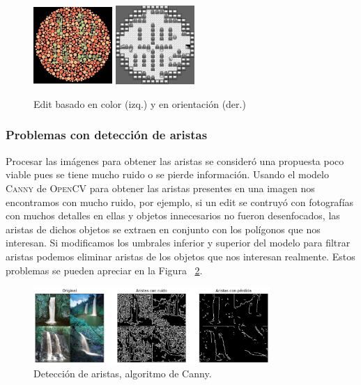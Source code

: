 \documentclass[spanish,11pt,letterpaper]{article}
\begin{document}
\begin{figure}[h]
\centering
\includegraphics[height=3cm,width=3cm]{loss_color}
\includegraphics[height=3cm,width=3cm]{pokemon}
\caption{Edit basado en color (izq.) y en orientación (der.)}
\label{fig:color}
\end{figure}

\subsubsection{Problemas con detección de aristas}

Procesar las imágenes para obtener las aristas se consideró una propuesta poco
viable pues se tiene mucho ruido o se pierde información. Usando el modelo
\textsc{Canny} de \textsc{OpenCV} para obtener las aristas presentes en una imagen
nos encontramos con mucho ruido, por ejemplo, si un edit se contruyó con fotografías
con muchos detalles en ellas y objetos innecesarios no fueron desenfocados, las
aristas de dichos objetos se extraen en conjunto con los polígonos que nos
interesan. Si modificamos los umbrales inferior y superior del modelo para filtrar
aristas podemos eliminar aristas de los objetos que nos interesan realmente. Estos
problemas se pueden apreciar en la Figura ~\ref{fig:canny}.

\begin{figure}[h]
\centering
\includegraphics[width=0.8\textwidth]{edges}
\caption{Detección de aristas, algoritmo de Canny.}
\label{fig:canny}
\end{figure}
\end{document}

